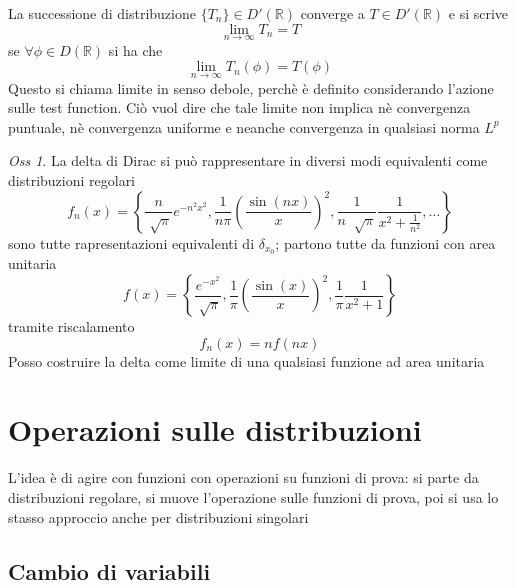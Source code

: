 \documentclass[a4paper,11pt]{report}
\theoremstyle{remark}
\newtheorem*{oss}{Oss}
\theoremstyle{definition}
\newcommand{\R}{\mathbb{R}}
\begin{document}
La successione di distribuzione $\{T_n\}\in D'(\R)$ converge a $T\in D'(\R)$ e si scrive
\begin{equation*}
	\lim_{n\to\infty}T_n = T
\end{equation*}
se $\forall \phi \in D(\R)$ si ha che 
\begin{equation*}
	\lim_{n\to\infty}T_n (\phi)= T(\phi)
\end{equation*}
Questo si chiama limite in senso debole, perchè è definito considerando l'azione sulle test function. Ciò vuol dire che tale limite non implica nè convergenza puntuale, nè convergenza uniforme e neanche convergenza in qualsiasi norma $L^p$

\begin{oss}
	La delta di Dirac si può rappresentare in diversi modi equivalenti come distribuzioni regolari
	\begin{equation*}
		f_n(x) = \left\{\frac{n}{\sqrt[]{\pi}}e^{-n^2x^2}, \frac{1}{n\pi}{\left(\frac{\sin{(nx)}}{x}\right)}^2, \frac{1}{n\; \sqrt[]{\pi}}\frac{1}{x^2+\frac{1}{n^2}},\dots \right\}
	\end{equation*}
	sono tutte rapresentazioni equivalenti di $\delta_{x_0}$; partono tutte da funzioni con area unitaria
	\begin{equation*}
		f(x) = \left\{\frac{e^{-x^2}}{\sqrt[]{\pi}}, \frac{1}{\pi}{\left(\frac{\sin{(x)}}{x}\right)}^2, \frac{1}{\pi}\frac{1}{x^2+1}\right\}
	\end{equation*}
	tramite riscalamento 
	\begin{equation*}
		f_n(x) = nf(nx)
	\end{equation*}
	Posso costruire la delta come limite di una qualsiasi funzione ad area unitaria
\end{oss}

\chapter{Operazioni sulle distribuzioni}

L'idea è di agire con funzioni con operazioni su funzioni di prova: si parte da distribuzioni regolare, si muove l'operazione sulle funzioni di prova, poi si usa lo stasso approccio anche per distribuzioni singolari

\section{Cambio di variabili}
\end{document}

